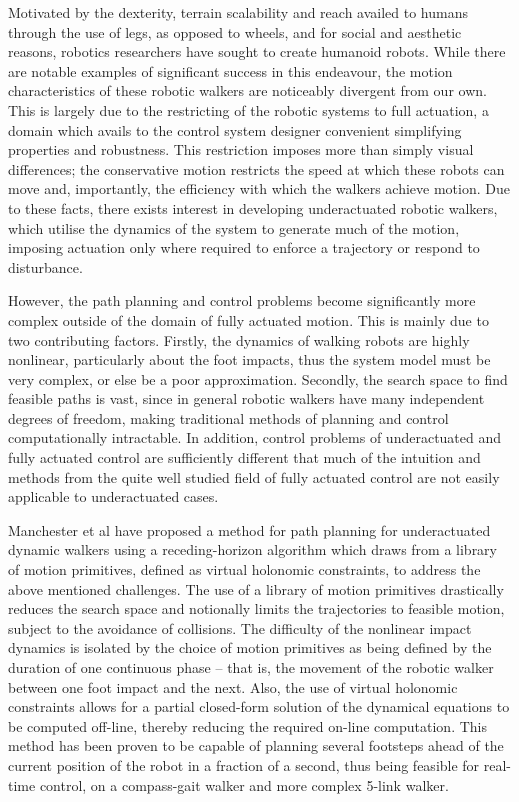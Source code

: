 Motivated by the dexterity, terrain scalability and reach availed to humans through the use of legs, as opposed to wheels, and for social and aesthetic reasons, robotics researchers have sought to create humanoid robots. While there are notable examples of significant success in this endeavour, the motion characteristics of these robotic walkers are noticeably divergent from our own. This is largely due to the restricting of the robotic systems to full actuation, a domain which avails to the control system designer convenient simplifying properties and robustness. This restriction imposes more than simply visual differences; the conservative motion restricts the speed at which these robots can move and, importantly, the efficiency with which the walkers achieve motion. Due to these facts, there exists interest in developing underactuated robotic walkers, which utilise the dynamics of the system to generate much of the motion, imposing actuation only where required to enforce a trajectory or respond to disturbance.

However, the path planning and control problems become significantly more complex outside of the domain of fully actuated motion. This is mainly due to two contributing factors. Firstly, the dynamics of walking robots are highly nonlinear, particularly about the foot impacts, thus the system model must be very complex, or else be a poor approximation. Secondly, the search space to find feasible paths is vast, since in general robotic walkers have many independent degrees of freedom, making traditional methods of planning and control computationally intractable. In addition, control problems of underactuated and fully actuated control are sufficiently different that much of the intuition and methods from the quite well studied field of fully actuated control are not easily applicable to underactuated cases.

Manchester et al \cite{manchester13planning} have proposed a method for path planning for underactuated dynamic walkers using a receding-horizon algorithm which draws from a library of motion primitives, defined as virtual holonomic constraints, to address the above mentioned challenges. The use of a library of motion primitives drastically reduces the search space and notionally limits the trajectories to feasible motion, subject to the avoidance of collisions. The difficulty of the nonlinear impact dynamics is isolated by the choice of motion primitives as being defined by the duration of one continuous phase – that is, the movement of the robotic walker between one foot impact and the next. Also, the use of virtual holonomic constraints allows for a partial closed-form solution of the dynamical equations to be computed off-line, thereby reducing the required on-line computation. This method has been proven to be capable of planning several footsteps ahead of the current position of the robot in a fraction of a second, thus being feasible for real-time control, on a compass-gait walker and more complex 5-link walker.


